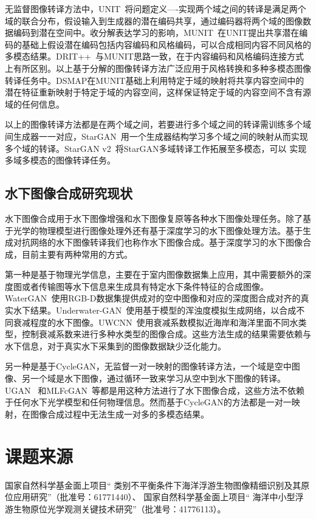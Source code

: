 无监督图像转译方法中，UNIT~\cite{liu2017unsupervised}将问题定义----实现两个域之间的转译是满足两个域的联合分布，假设输入到生成器的潜在编码共享，通过编码器将两个域的图像数据编码到潜在空间中。收分解表达学习的影响，MUNIT~\cite{huang2018multimodal}在UNIT提出共享潜在编码的基础上假设潜在编码包括内容编码和风格编码，可以合成相同内容不同风格的多模态结果。DRIT++~\cite{lee2020drit++}与MUNIT思路一致，在于内容编码和风格编码连接方式上有所区别。以上基于分解的图像转译方法广泛应用于风格转换和多种多模态图像转译任务中。DSMAP在MUNIT基础上利用特定于域的映射将共享内容空间中的潜在特征重新映射于特定于域的内容空间，这样保证特定于域的内容空间不含有源域的任何信息。

以上的图像转译方法都是在两个域之间，若要进行多个域之间的转译需训练多个域间生成器一一对应，StarGAN~\cite{choi2018stargan}用一个生成器结构学习多个域之间的映射从而实现多个域的转译。StarGAN v2~\cite{choi2020stargan}将StarGAN多域转译工作拓展至多模态，可以 实现多域多模态的图像转译任务。%


\subsection{水下图像合成研究现状} 
水下图像合成用于水下图像增强和水下图像复原等各种水下图像处理任务。除了基于光学的物理模型进行图像处理外还有基于深度学习的水下图像处理方法。基于生成对抗网络的水下图像转译我们也称作水下图像合成。基于深度学习的水下图像合成，目前主要有两种常用的方式。

第一种是基于物理光学信息，主要在于室内图像数据集上应用，其中需要额外的深度图或者传输图等水下信息来生成具有特定水下条件特征的合成图像。WaterGAN~\cite{li2017watergan}使用RGB-D数据集提供成对的空中图像和对应的深度图合成对齐的真实水下结果。Underwater-GAN~\cite{yu2018underwater}使用基于模型的浑浊度模拟生成网络，以合成不同衰减程度的水下图像。UWCNN~\cite{li2020underwater}使用衰减系数模拟近海岸和海洋里面不同水类型，控制衰减系数来进行多种水类型的图像合成。这些方法生成的结果需要依赖与水下信息，对于真实水下采集到的图像数据缺少泛化能力。

另一种是基于CycleGAN，无监督一对一映射的图像转译方法，一个域是空中图像、另一个域是水下图像，通过循环一致来学习从空中到水下图像的转译。UGAN~
\cite{fabbri2018enhancing}和MLFcGAN~\cite{liu2019mlfcgan}等都是用这种方法进行了水下图像合成，这些方法不依赖于任何水下光学模型和任何物理信息。然而基于CycleGAN的方法都是一对一映射，在图像合成过程中无法生成一对多的多模态结果。


\section{课题来源}
国家自然科学基金面上项目“ 类别不平衡条件下海洋浮游生物图像精细识别及其原位应用研究”（批准号：61771440）、   国家自然科学基金面上项目“ 海洋中小型浮游生物原位光学观测关键技术研究”（批准号：41776113）。


